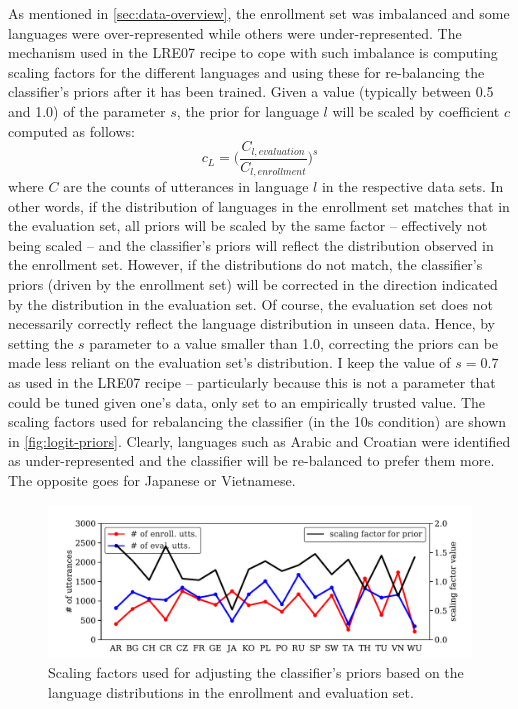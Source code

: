 \documentclass[bsc,frontabs,twoside,singlespacing,parskip,deptreport]{infthesis}
\begin{document}
{{{      %
      As mentioned in \autoref{sec:data-overview}, the enrollment set was imbalanced and some languages were over-represented while others were under-represented. The mechanism used in the LRE07 recipe to cope with such imbalance is computing scaling factors for the different languages and using these for re-balancing the classifier's priors after it has been trained. Given a value (typically between 0.5 and 1.0) of the parameter $s$, the prior for language $l$ will be scaled by coefficient $c$ computed as follows:
      \begin{equation}
        \label{eq:logit-prior}
        c_L = \bigg( \frac{C_{l, evaluation}}{C_{l, enrollment}} \bigg)^s
      \end{equation}
      where $C$ are the counts of utterances in language $l$ in the respective data sets. In other words, if the distribution of languages in the enrollment set matches that in the evaluation set, all priors will be scaled by the same factor -- effectively not being scaled -- and the classifier's priors will reflect the distribution observed in the enrollment set. However, if the distributions do not match, the classifier's priors (driven by the enrollment set) will be corrected in the direction indicated by the distribution in the evaluation set. Of course, the evaluation set does not necessarily correctly reflect the language distribution in unseen data. Hence, by setting the $s$ parameter to a value smaller than 1.0, correcting the priors can be made less reliant on the evaluation set's distribution.
      I keep the value of $s=0.7$ as used in the LRE07 recipe -- particularly because this is not a parameter that could be tuned given one's data, only set to an empirically trusted value. The scaling factors used for rebalancing the classifier (in the 10s condition) are shown in \autoref{fig:logit-priors}. Clearly, languages such as Arabic and Croatian were identified as under-represented and the classifier will be re-balanced to prefer them more. The opposite goes for Japanese or Vietnamese.
      \begin{figure}[h!t]
        \centering
        \includegraphics[width=15cm]{../img/logit-priors.pdf}
        \vspace*{-1em}
        \caption{Scaling factors used for adjusting the classifier's priors based on the language distributions in the enrollment and evaluation set.}
        \label{fig:logit-priors}
      \end{figure}

}}}
\end{document}
